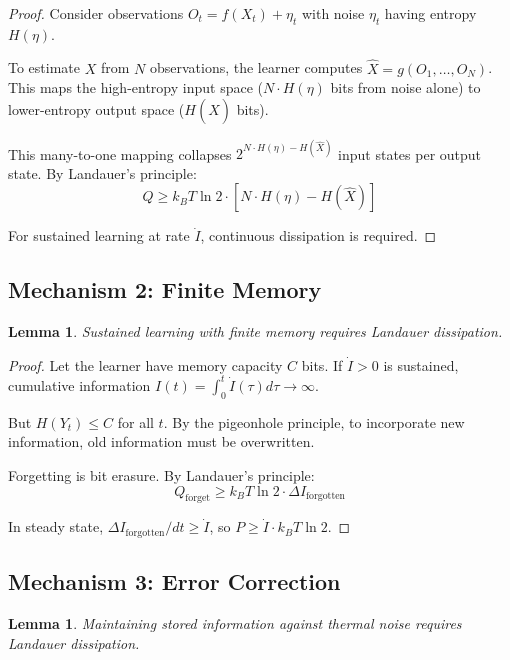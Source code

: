 \documentclass{article}
\newtheorem{lemma}[theorem]{Lemma}
\begin{document}
\begin{proof}
Consider observations $O_t = f(X_t) + \eta_t$ with noise $\eta_t$ having entropy $H(\eta)$.

To estimate $X$ from $N$ observations, the learner computes $\hat{X} = g(O_1, \ldots, O_N)$. This maps the high-entropy input space ($N \cdot H(\eta)$ bits from noise alone) to lower-entropy output space ($H(\hat{X})$ bits).

This many-to-one mapping collapses $2^{N \cdot H(\eta) - H(\hat{X})}$ input states per output state. By Landauer's principle:
\begin{equation}
Q \geq k_B T \ln 2 \cdot [N \cdot H(\eta) - H(\hat{X})]
\end{equation}

For sustained learning at rate $\dot{I}$, continuous dissipation is required.
\end{proof}

\subsection{Mechanism 2: Finite Memory}

\begin{lemma}
Sustained learning with finite memory requires Landauer dissipation.
\end{lemma}

\begin{proof}
Let the learner have memory capacity $C$ bits. If $\dot{I} > 0$ is sustained, cumulative information $I(t) = \int_0^t \dot{I}(\tau) d\tau \to \infty$.

But $H(Y_t) \leq C$ for all $t$. By the pigeonhole principle, to incorporate new information, old information must be overwritten.

Forgetting is bit erasure. By Landauer's principle:
\begin{equation}
Q_{\text{forget}} \geq k_B T \ln 2 \cdot \Delta I_{\text{forgotten}}
\end{equation}

In steady state, $\Delta I_{\text{forgotten}}/dt \geq \dot{I}$, so $P \geq \dot{I} \cdot k_B T \ln 2$.
\end{proof}

\subsection{Mechanism 3: Error Correction}

\begin{lemma}
Maintaining stored information against thermal noise requires Landauer dissipation.
\end{lemma}
\end{document}
